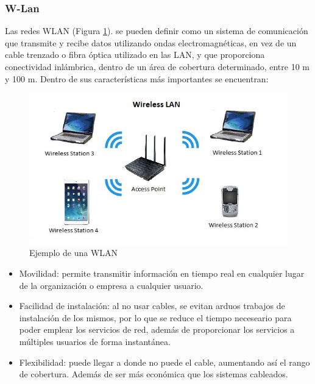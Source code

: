 \subsubsection{W-Lan}

Las redes WLAN (Figura \ref{fig:wlan}). se pueden definir como un sistema de comunicación que transmite y recibe datos utilizando ondas electromagnéticas, en vez de un cable trenzado o fibra óptica utilizado en las LAN, y que proporciona conectividad inlámbrica, dentro de un área de cobertura determinado, entre 10 m y 100 m\cite{varela2002redes}. Dentro de sus características más importantes se encuentran:\\

\begin{figure}[!h]
	\centering
		\includegraphics[scale=0.6]{Imagenes/wlan}
		\caption[Ejemplo de una WLAN, for L0F]{Ejemplo de una WLAN \protect\footnotemark}
		\label{fig:wlan}
	\end{figure}	

\begin{itemize}
	\item Movilidad: permite transmitir información en tiempo real en cualquier lugar de la organización o empresa a cualquier usuario.
	\item Facilidad de instalación: al no usar cables, se evitan arduos trabajos de instalación de los mismos, por lo que se reduce el tiempo neceseario para poder emplear los servicios de red, además de proporcionar los servicios a múltiples usuarios de forma instantánea.
	\item Flexibilidad: puede llegar a donde no puede el cable, aumentando así el rango de cobertura. Además de ser más económica que los sistemas cableados.
\end{itemize}

